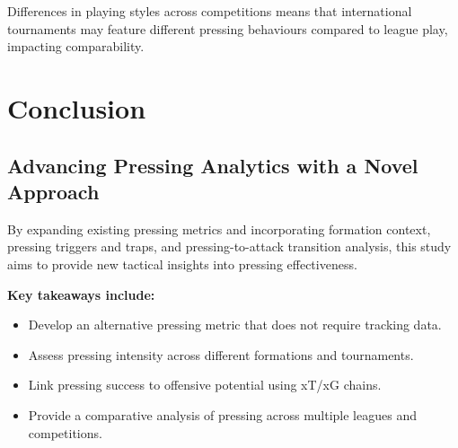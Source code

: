 Differences in playing styles across competitions means that international tournaments may feature different pressing behaviours compared to league play, impacting comparability.

\section{Conclusion}

\subsection{Advancing Pressing Analytics with a Novel Approach}

By expanding existing pressing metrics and incorporating formation context, pressing triggers and traps, and pressing-to-attack transition analysis, this study aims to provide new tactical insights into pressing effectiveness.

\textbf{Key takeaways include:}
\begin{itemize}
    \item Develop an alternative pressing metric that does not require tracking data.
    \item Assess pressing intensity across different formations and tournaments.
    \item Link pressing success to offensive potential using xT/xG chains.
    \item Provide a comparative analysis of pressing across multiple leagues and competitions.
\end{itemize}